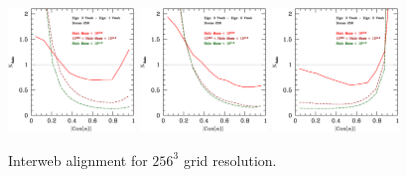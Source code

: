 \documentclass[usenatbib]{mn2e}
\begin{document}
\begin{figure}
\includegraphics[width=0.30\textwidth]{../plot2/256/256_T3V1.ps}
\includegraphics[width=0.30\textwidth]{../plot2/256/256_T3V2.ps}
\includegraphics[width=0.30\textwidth]{../plot2/256/256_T3V3.ps}
\caption{Interweb alignment for $256^3$ grid resolution.}
\end{figure}
\end{document}
